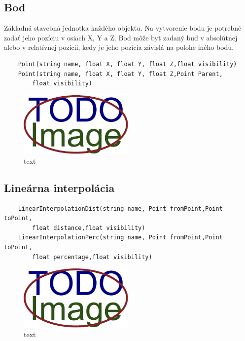\subsection{Bod}
Základná stavebná jednotka každého objektu. Na vytvorenie bodu je potrebné zadať jeho pozíciu v osiach X, Y a Z. Bod môže byť zadaný buď v absolútnej alebo v relatívnej pozícii, kedy je jeho pozícia závislá na polohe iného bodu.
\begin{lstlisting}
    Point(string name, float X, float Y, float Z,float visibility) 
    Point(string name, float X, float Y, float Z,Point Parent,
        float visibility)
\end{lstlisting}
\begin{figure}[H]
	\centering
	\includegraphics[width=0.5\textwidth]{obrazky-figures/placeholder.pdf}
	\caption{text}
	\label{fig:1}
\end{figure}

\subsection{Lineárna interpolácia}
\begin{lstlisting}
    LinearInterpolationDist(string name, Point fromPoint,Point toPoint,
        float distance,float visibility)
    LinearInterpolationPerc(string name, Point fromPoint,Point toPoint,
        float percentage,float visibility)
\end{lstlisting}

\begin{figure}[H]
	\centering
	\includegraphics[width=0.5\textwidth]{obrazky-figures/placeholder.pdf}
	\caption{text}
	\label{fig:1}
\end{figure}


